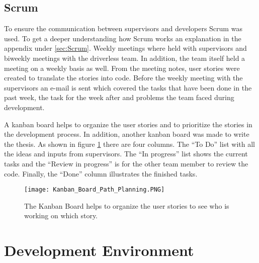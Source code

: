 \subsection{Scrum} \label{sec:Planning Method: Scrum}
To ensure the communication between supervisors and developers Scrum was used. To get a deeper understanding how Scrum works an explanation in the appendix under \ref{sec:Scrum}. Weekly meetings where held with supervisors and biweekly meetings with the driverless team. In addition, the team itself held a meeting on a weekly basis as well. From the meeting notes, user stories were created to translate the stories into code. Before the weekly meeting with the supervisors an e-mail is sent which covered the tasks that have been done in the past week, the task for the week after and problems the team faced during development.

A kanban board helps to organize the user stories and to prioritize the stories in the development process. In addition, another kanban board was made to write the thesis. As shown in figure \ref{fig:Kanban Board Path Planning} there are four columns. The ``To Do'' list with all the ideas and inputs from supervisors. The ``In progress'' list shows the current tasks and the ``Review in progress'' is for the other team member to review the code. Finally, the ``Done'' column illustrates the finished tasks.
\begin{figure}[H]
    \centering
    \texttt{[image: Kanban\_Board\_Path\_Planning.PNG]}
    \caption{The Kanban Board helps to organize the user stories to see who is working on which story.}
    \label{fig:Kanban Board Path Planning}
\end{figure}

\section{Development Environment} \label{sec:Development Environment}

